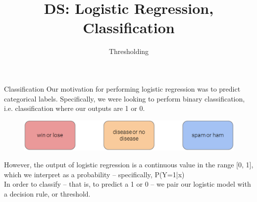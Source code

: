 \documentclass[aspectratio=169]{../latex_main/tntbeamer}  %
\title[Introduction]{DS: Logistic Regression, Classification}
\subtitle{Thresholding}
\begin{document}
	
	\maketitle
	\begin{frame}{Classification}
	    Our motivation for performing logistic regression was to predict categorical labels. Specifically, we were looking to perform binary classification, i.e. classification where our outputs are 1 or 0.
	    \begin{figure}
	        \centering
	        \includegraphics[scale=.5]{Bild1}
	    \end{figure}
	    However, the output of logistic regression is a continuous value in the range [0, 1], which we interpret as a probability – specifically,  P(Y=1|x)\\
	    \bigskip
	    In order to classify – that is, to predict a 1 or 0 – we pair our logistic model with a decision rule, or threshold.
	\end{frame}
	
	
	
\end{document}
